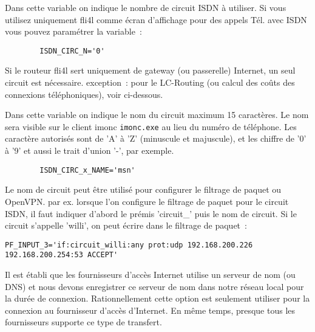 \begin{description}

  Dans cette variable on indique le nombre de circuit ISDN à utiliser.
  Si vous utilisez uniquement fli4l comme écran d'affichage pour des appels
  Tél. avec ISDN vous pouvez paramétrer la variable~:

\begin{example}
\begin{verbatim}
        ISDN_CIRC_N='0'
\end{verbatim}
\end{example}

  Si le routeur fli4l sert uniquement de gateway (ou passerelle) Internet,
  un seul circuit est nécessaire. exception~: pour le LC-Routing (ou calcul des coûts
  des connexions téléphoniques), voir ci-dessous.


  Dans cette variable on indique le nom du circuit maximum 15 caractères. Le nom
  sera visible sur le client imonc \texttt{imonc.exe} au lieu du numéro de téléphone.
  Les caractère autorisés sont de 'A' à 'Z' (minuscule et majuscule), et les chiffre
  de '0' à '9' et aussi le trait d'union '-', par exemple.

\begin{example}
\begin{verbatim}
        ISDN_CIRC_x_NAME='msn'
\end{verbatim}
\end{example}

  Le nom de circuit peut être utilisé pour configurer le filtrage de paquet ou
  OpenVPN. par ex. lorsque l'on configure le filtrage de paquet pour le circuit ISDN,
  il faut indiquer d'abord le prémis 'circuit\_' puis le nom de circuit. Si le
  circuit s'appelle 'willi', on peut écrire dans le filtrage de paquet~:

\begin{example}
\begin{verbatim}
PF_INPUT_3='if:circuit_willi:any prot:udp 192.168.200.226 192.168.200.254:53 ACCEPT'
\end{verbatim}
\end{example}


  Il est établi que les fournisseurs d'accès Internet utilise un serveur de
  nom (ou DNS) et nous devons enregistrer ce serveur de nom dans notre réseau
  local pour la durée de connexion. Rationnellement cette option est seulement
  utiliser pour la connexion au fournisseur d'accès d'Internet. En même temps,
  presque tous les fournisseurs supporte ce type de transfert.


\end{description}
